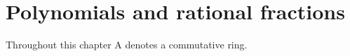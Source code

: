 \chapter{Polynomials and rational fractions}

Throughout this chapter A denotes a commutative ring.

